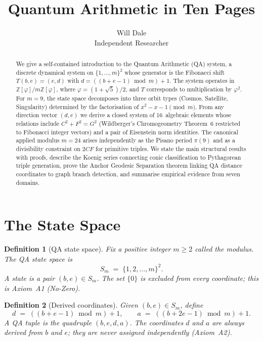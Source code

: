 \documentclass[11pt]{article}
\newtheorem{definition}{Definition}[section]
\begin{document}
\title{Quantum Arithmetic in Ten Pages}
\author{Will Dale\\
\small Independent Researcher}
\date{}
\maketitle

\begin{abstract}
We give a self-contained introduction to the Quantum Arithmetic (QA) system,
a discrete dynamical system on $\{1,\dots,m\}^2$ whose generator is the
Fibonacci shift $T(b,e)=(e,d)$ with $d=((b+e-1)\bmod m)+1$.  The system
operates in $\mathbb{Z}[\varphi]/m\mathbb{Z}[\varphi]$, where $\varphi=(1+\sqrt{5})/2$,
and $T$ corresponds to multiplication by $\varphi^2$.  For $m=9$, the state
space decomposes into three orbit types (Cosmos, Satellite, Singularity)
determined by the factorisation of $x^2-x-1\pmod{m}$.  From any direction
vector $(d,e)$ we derive a closed system of 16~algebraic elements whose
relations include $C^2+F^2=G^2$ (Wildberger's Chromogeometry Theorem~6
restricted to Fibonacci integer vectors) and a pair of Eisenstein norm
identities.  The canonical applied modulus $m=24$ arises independently as the
Pisano period $\pi(9)$ and as a divisibility constraint on $2CF$ for
primitive triples.  We state the main structural results with proofs,
describe the Koenig series connecting conic classification to Pythagorean
triple generation, prove the Anchor Geodesic Separation theorem linking
QA distance coordinates to graph branch detection, and summarise empirical
evidence from seven domains.
\end{abstract}

\section{The State Space}\label{sec:state}

\begin{definition}[QA state space]
Fix a positive integer $m \geq 2$ called the \emph{modulus}.  The \emph{QA state space} is
\[
  S_m \;=\; \{1, 2, \dots, m\}^2.
\]
A \emph{state} is a pair $(b,e) \in S_m$.  The set $\{0\}$ is excluded from every coordinate; this is Axiom~A1 (No-Zero).
\end{definition}

\begin{definition}[Derived coordinates]
Given $(b,e) \in S_m$, define
\[
  d \;=\; ((b+e-1) \bmod m) + 1, \qquad
  a \;=\; ((b+2e-1) \bmod m) + 1.
\]
A \emph{QA tuple} is the quadruple $(b,e,d,a)$.  The coordinates $d$ and $a$ are always derived from $b$ and $e$; they are never assigned independently (Axiom~A2).
\end{definition}
\end{document}
